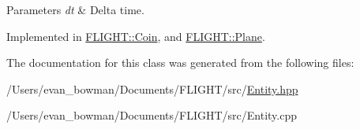 \begin{DoxyParams}{Parameters}
{\em dt} & Delta time. \\
\hline
\end{DoxyParams}


Implemented in \hyperlink{class_f_l_i_g_h_t_1_1_coin_a22a213738cf0e29a32b094cb7695e7c0}{F\+L\+I\+G\+H\+T\+::\+Coin}, and \hyperlink{class_f_l_i_g_h_t_1_1_plane_a53d47170a7314c523f91e8dc26a5a9ab}{F\+L\+I\+G\+H\+T\+::\+Plane}.



The documentation for this class was generated from the following files\+:\begin{DoxyCompactItemize}
\item 
/\+Users/evan\+\_\+bowman/\+Documents/\+F\+L\+I\+G\+H\+T/src/\hyperlink{_entity_8hpp}{Entity.\+hpp}\item 
/\+Users/evan\+\_\+bowman/\+Documents/\+F\+L\+I\+G\+H\+T/src/Entity.\+cpp\end{DoxyCompactItemize}
